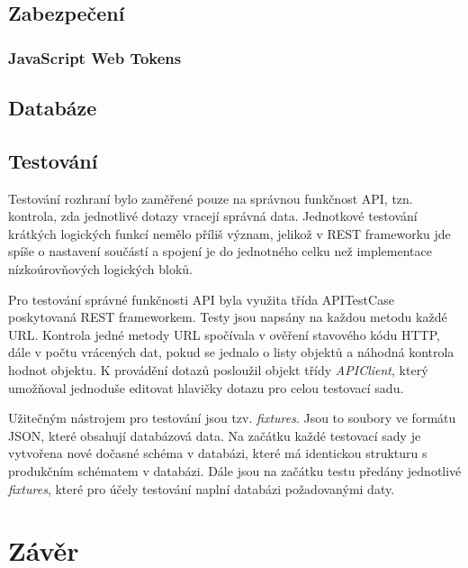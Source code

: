 \documentclass[a4paper,11pt,titlepage,fleqn]{article}
\begin{document}
    \subsection{Zabezpečení}


        \subsubsection{JavaScript Web Tokens}
            \label{jwt}

    \subsection{Databáze}
        \label{db}

    \subsection{Testování}
        Testování rozhraní bylo zaměřené pouze na správnou funkčnost API, tzn. kontrola, zda jednotlivé dotazy vracejí správná data. Jednotkové testování krátkých logických funkcí nemělo příliš význam, jelikož v REST frameworku jde spíše o nastavení součástí a spojení je do jednotného celku než implementace nízkoúrovňových logických bloků.
        
        Pro testování správné funkčnosti API byla využita třída APITestCase poskytovaná REST frameworkem. Testy jsou napsány na každou metodu každé URL. Kontrola jedné metody URL spočívala v ověření stavového kódu HTTP, dále v počtu vrácených dat, pokud se jednalo o listy objektů a náhodná kontrola hodnot objektu. K provádění dotazů posloužil objekt třídy \textit{APIClient}, který umožňoval jednoduše editovat hlavičky dotazu pro celou testovací sadu. 

        Užitečným nástrojem pro testování jsou tzv. \textit{fixtures}. Jsou to soubory ve formátu JSON, které obsahují databázová data. Na začátku každé testovací sady je vytvořena nové dočasné schéma v databázi, které má identickou strukturu s produkčním schématem v databázi. Dále jsou na začátku testu předány jednotlivé \textit{fixtures}, které pro účely testování naplní databázi požadovanými daty.


\newpage
\section{Závěr}
\end{document}
